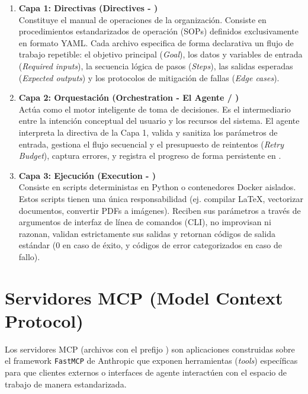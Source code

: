 \documentclass[12pt,a4paper]{article}
\begin{document}
\begin{enumerate}
    \item \textbf{Capa 1: Directivas (Directives - )} \\
    Constituye el manual de operaciones de la organización. Consiste en procedimientos estandarizados de operación (SOPs) definidos exclusivamente en formato YAML. Cada archivo especifica de forma declarativa un flujo de trabajo repetible: el objetivo principal (\textit{Goal}), los datos y variables de entrada (\textit{Required inputs}), la secuencia lógica de pasos (\textit{Steps}), las salidas esperadas (\textit{Expected outputs}) y los protocolos de mitigación de fallas (\textit{Edge cases}).
    
    \item \textbf{Capa 2: Orquestación (Orchestration - El Agente / )} \\
    Actúa como el motor inteligente de toma de decisiones. Es el intermediario entre la intención conceptual del usuario y los recursos del sistema. El agente interpreta la directiva de la Capa 1, valida y sanitiza los parámetros de entrada, gestiona el flujo secuencial y el presupuesto de reintentos (\textit{Retry Budget}), captura errores, y registra el progreso de forma persistente en .
    
    \item \textbf{Capa 3: Ejecución (Execution - )} \\
    Consiste en scripts deterministas en Python o contenedores Docker aislados. Estos scripts tienen una única responsabilidad (ej. compilar LaTeX, vectorizar documentos, convertir PDFs a imágenes). Reciben sus parámetros a través de argumentos de interfaz de línea de comandos (CLI), no improvisan ni razonan, validan estrictamente sus salidas y retornan códigos de salida estándar (0 en caso de éxito, y códigos de error categorizados en caso de fallo).
\end{enumerate}

\section{Servidores MCP (Model Context Protocol)}

Los servidores MCP (archivos con el prefijo ) son aplicaciones construidas sobre el framework \texttt{FastMCP} de Anthropic que exponen herramientas (\textit{tools}) específicas para que clientes externos o interfaces de agente interactúen con el espacio de trabajo de manera estandarizada.
\end{document}
